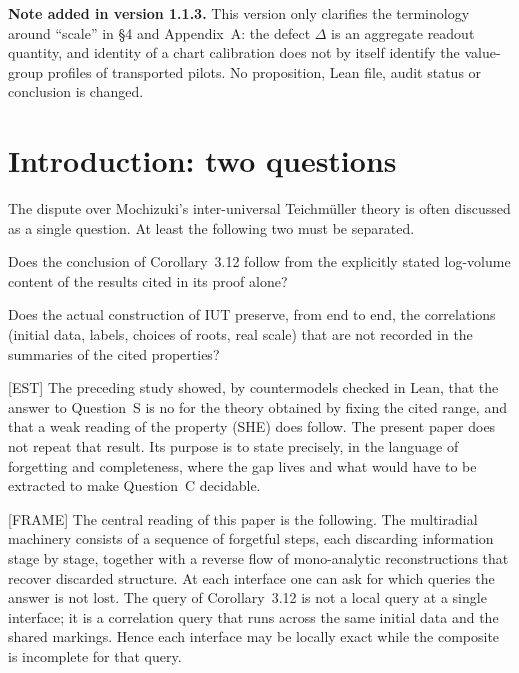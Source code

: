 \documentclass[11pt]{article}
\theoremstyle{plain}
\theoremstyle{definition}
\theoremstyle{remark}
\newcommand{\FRAME}{\textup{[FRAME]}}
\newcommand{\EST}{\textup{[EST]}}
\begin{document}
\medskip
\noindent\textbf{Note added in version 1.1.3.}
This version only clarifies the terminology around ``scale'' in
\S4 and Appendix~A: the defect $\Delta$ is an aggregate readout
quantity, and identity of a chart calibration does not by itself
identify the value-group profiles of transported pilots.  No
proposition, Lean file, audit status or conclusion is changed.

\section{Introduction: two questions}

The dispute over Mochizuki's inter-universal Teichm\"uller theory is
often discussed as a single question.  At least the following two
must be separated.

\begin{description}[style=nextline]
\item[Question S (specification).] Does the conclusion of
Corollary~3.12 follow from the explicitly stated log-volume content
of the results cited in its proof alone?
\item[Question C (construction).] Does the actual construction of
IUT preserve, from end to end, the correlations (initial data,
labels, choices of roots, real scale) that are not recorded in the
summaries of the cited properties?
\end{description}

\EST{} The preceding study \cite{U26} showed, by countermodels
checked in Lean, that the answer to Question~S is no for the theory
obtained by fixing the cited range, and that a weak reading of the
property (SHE) does follow.  The present paper does not repeat that
result.  Its purpose is to state precisely, in the language of
forgetting and completeness, where the gap lives and what would have
to be extracted to make Question~C decidable.

\FRAME{} The central reading of this paper is the following.  The
multiradial machinery consists of a sequence of forgetful steps,
each discarding information stage by stage, together with a reverse
flow of mono-analytic reconstructions that recover discarded
structure.  At each interface one can ask for which queries the
answer is not lost.  The query of Corollary~3.12 is not a local
query at a single interface; it is a correlation query that runs
across the same initial data and the shared markings.  Hence each
interface may be locally exact while the composite is incomplete for
that query.
\end{document}
